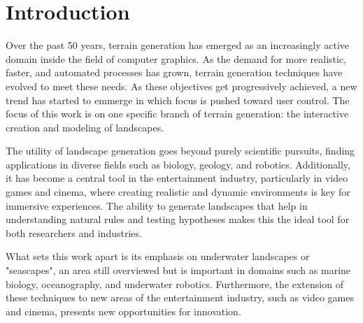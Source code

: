 \chapter{Introduction}
\label{chap:introduction}

Over the past 50 years, terrain generation has emerged as an increasingly active domain inside the field of computer graphics. As the demand for more realistic, faster, and automated processes has grown, terrain generation techniques have evolved to meet these needs. As these objectives get progressively achieved, a new trend has started to emmerge in which focus is pushed toward user control. The focus of this work is on one specific branch of terrain generation: the interactive creation and modeling of landscapes.

The utility of landscape generation goes beyond purely scientific pursuits, finding applications in diverse fields such as biology, geology, and robotics. Additionally, it has become a central tool in the entertainment industry, particularly in video games and cinema, where creating realistic and dynamic environments is key for immersive experiences. The ability to generate landscapes that help in understanding natural rules and testing hypotheses makes this the ideal tool for both researchers and industries.

What sets this work apart is its emphasis on underwater landscapes or "seascapes", an area still overviewed but is important in domains such as marine biology, oceanography, and underwater robotics. Furthermore, the extension of these techniques to new areas of the entertainment industry, such as video games and cinema, presents new opportunities for innovation.

